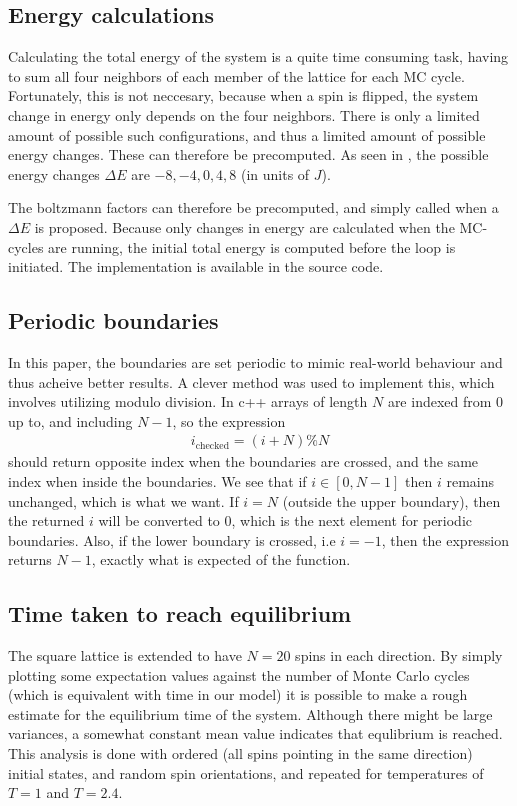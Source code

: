 \documentclass[aps,reprint]{revtex4-1}
\begin{document}
\subsection{Energy calculations}
Calculating the total energy of the system is a quite time consuming task, having
to sum all four neighbors of each member of the lattice for each MC cycle. Fortunately,
this is not neccesary, because when a spin is flipped, the system change in energy
only depends on the four neighbors. There is only a limited amount of possible
such configurations, and thus a limited amount of possible energy changes. These
can therefore be precomputed. As seen in \cite{mortenjensen}, the possible
energy changes $\Delta E$ are $-8, -4, 0, 4, 8$ (in units of $J$).

The boltzmann factors can therefore be precomputed, and simply called when a $\Delta E$
is proposed. Because only changes in energy are calculated when the MC-cycles
are running, the initial total energy is computed before the loop is initiated.
The implementation is available in the source code.
\subsection{Periodic boundaries}
In this paper, the boundaries are set periodic to mimic real-world behaviour and
thus acheive better results. A clever method was used to implement this, which
involves utilizing modulo division. In c++ arrays of length $N$ are indexed from
$0$ up to, and including $N-1$, so the expression
\begin{align*}
  i_\text{checked} = (i + N) \% N
\end{align*}
should return opposite index when the boundaries are crossed, and the same
index when inside the boundaries. We see that if $i \in [0, N-1]$ then $i$
remains unchanged, which is what we want. If $i = N$ (outside the upper boundary),
then the returned $i$ will be converted to $0$, which is the next element for
periodic boundaries. Also, if the lower boundary is crossed, i.e $i = -1$, then
the expression returns $N - 1$, exactly what is expected of the function.

\subsection{Time taken to reach equilibrium}
The square lattice is extended to have $N = 20$ spins in each direction. By simply
plotting some expectation values against the number of Monte Carlo cycles (which
is equivalent with time in our model) it is possible to make a rough estimate
for the equilibrium time of the system. Although there might be large variances,
a somewhat constant mean value indicates that equlibrium is reached. This analysis is done with ordered
(all spins pointing in the same direction) initial states, and random
spin orientations, and repeated for temperatures of $T = 1$ and $T = 2.4$.
\end{document}
